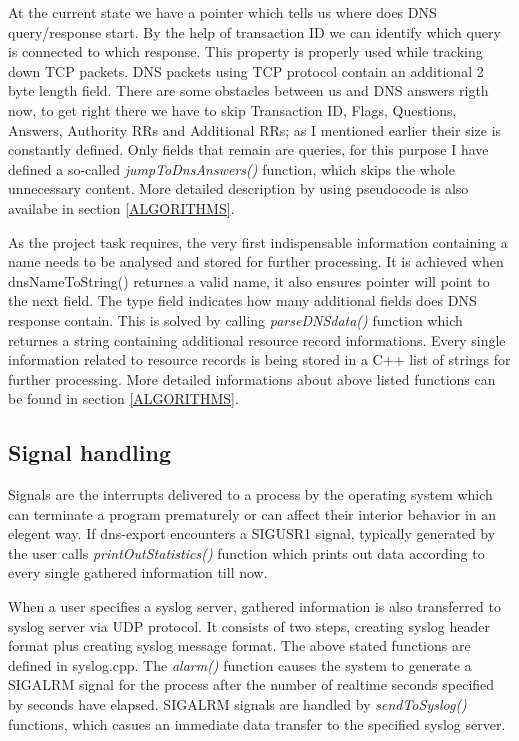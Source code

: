 \documentclass[11pt,a4paper]{article}
\begin{document}
At the current state we have a pointer which tells us where does DNS query/response start. By the help of transaction ID we can identify which query is connected to which response. This property is properly used while tracking down TCP packets. DNS packets using TCP protocol contain an additional 2 byte length field. There are some obstacles between us and DNS answers rigth now, to get right there we have to skip Transaction ID, Flags, Questions, Answers, Authority RRs and Additional RRs; as I mentioned earlier their size is constantly defined. Only fields that remain are queries, for this purpose I have defined a so-called \textit{jumpToDnsAnswers()} function, which skips the whole unnecessary content. More detailed description by using pseudocode is also availabe in section \ref{ALGORITHMS}.

As the project task requires, the very first indispensable information containing a name needs to be analysed and stored for further processing. It is achieved when dnsNameToString() returnes a valid name, it also ensures pointer will point to the next field. The type field indicates how many additional fields does DNS response contain. This is solved by calling \textit{parseDNSdata()} function which returnes a string containing additional resource record informations. Every single information related to resource records is being stored in a C++ list of strings for further processing. More detailed informations about above listed functions can be found in section \ref{ALGORITHMS}.

\subsection{Signal handling}
Signals are the interrupts delivered to a process by the operating system which can terminate a program prematurely or can affect their interior behavior in an elegent way. If dns-export encounters a SIGUSR1 signal, typically generated by the user calls \textit{printOutStatistics()} function which prints out data according to every single gathered information till now.

When a user specifies a syslog server, gathered information is also transferred to syslog server via UDP protocol. It consists of two steps, creating syslog header format plus creating syslog message format. The above stated functions are defined in syslog.cpp. The \textit{alarm()} function causes the system to generate a SIGALRM signal for the process after the number of realtime seconds specified by seconds have elapsed. SIGALRM signals are handled by \textit{sendToSyslog()} functions, which casues an immediate data transfer to the specified syslog server.
\end{document}
